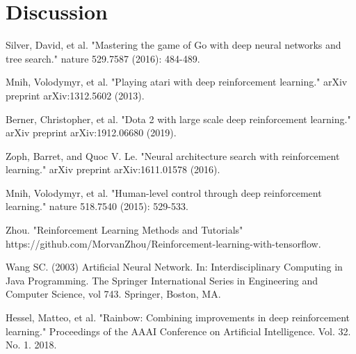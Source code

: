 \documentclass[12pt]{article}
\begin{document}
\section{Discussion}




\begin{thebibliography}{99}
	Silver, David, et al. "Mastering the game of Go with deep neural networks and tree search." nature 529.7587 (2016): 484-489.

	Mnih, Volodymyr, et al. "Playing atari with deep reinforcement learning." arXiv preprint arXiv:1312.5602 (2013).

	Berner, Christopher, et al. "Dota 2 with large scale deep reinforcement learning." arXiv preprint arXiv:1912.06680 (2019).

    Zoph, Barret, and Quoc V. Le. "Neural architecture search with reinforcement learning." arXiv preprint arXiv:1611.01578 (2016).

    Mnih, Volodymyr, et al. "Human-level control through deep reinforcement learning." nature 518.7540 (2015): 529-533.

    Zhou. "Reinforcement Learning Methods and Tutorials" https://github.com/MorvanZhou/Reinforcement-learning-with-tensorflow.

    Wang SC. (2003) Artificial Neural Network. In: Interdisciplinary Computing in Java Programming. The Springer International Series in Engineering and Computer Science, vol 743. Springer, Boston, MA.

    Hessel, Matteo, et al. "Rainbow: Combining improvements in deep reinforcement learning." Proceedings of the AAAI Conference on Artificial Intelligence. Vol. 32. No. 1. 2018.
\end{thebibliography}
\end{document}
